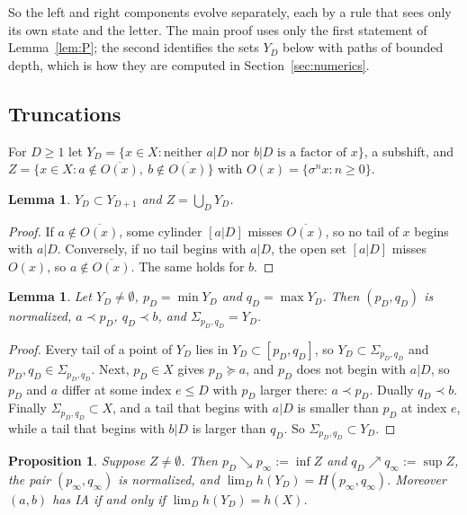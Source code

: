 \documentclass[11pt]{amsart}
\newtheorem{proposition}[theorem]{Proposition}
\newtheorem{lemma}[theorem]{Lemma}
\theoremstyle{definition}
\theoremstyle{remark}
\newcommand{\gex}{\succcurlyeq}
\begin{document}
So the left and right components evolve separately, each by a rule that sees only its own state and the letter. The main proof uses only the first statement of Lemma~\ref{lem:P}; the second identifies the sets $Y_D$ below with paths of bounded depth, which is how they are computed in Section~\ref{sec:numerics}.

\subsection{Truncations}
For $D\ge1$ let $Y_D=\{x\in X:\text{neither }a|D\text{ nor }b|D\text{ is a factor of }x\}$, a subshift, and $Z=\{x\in X:a\notin\overline{O(x)},\ b\notin\overline{O(x)}\}$ with $O(x)=\{\sigma^nx:n\ge0\}$.

\begin{lemma}\label{lem:Y1}
$Y_D\subset Y_{D+1}$ and $Z=\bigcup_DY_D$.
\end{lemma}

\begin{proof}
If $a\notin\overline{O(x)}$, some cylinder $[a|D]$ misses $\overline{O(x)}$, so no tail of $x$ begins with $a|D$. Conversely, if no tail begins with $a|D$, the open set $[a|D]$ misses $O(x)$, so $a\notin\overline{O(x)}$. The same holds for $b$.
\end{proof}

\begin{lemma}\label{lem:Y2}
Let $Y_D\ne\emptyset$, $p_D=\min Y_D$ and $q_D=\max Y_D$. Then $(p_D,q_D)$ is normalized, $a\prec p_D$, $q_D\prec b$, and $\Sigma_{p_D,q_D}=Y_D$.
\end{lemma}

\begin{proof}
Every tail of a point of $Y_D$ lies in $Y_D\subset[p_D,q_D]$, so $Y_D\subset\Sigma_{p_D,q_D}$ and $p_D,q_D\in\Sigma_{p_D,q_D}$. Next, $p_D\in X$ gives $p_D\gex a$, and $p_D$ does not begin with $a|D$, so $p_D$ and $a$ differ at some index $e\le D$ with $p_D$ larger there: $a\prec p_D$. Dually $q_D\prec b$. Finally $\Sigma_{p_D,q_D}\subset X$, and a tail that begins with $a|D$ is smaller than $p_D$ at index $e$, while a tail that begins with $b|D$ is larger than $q_D$. So $\Sigma_{p_D,q_D}\subset Y_D$.
\end{proof}

\begin{proposition}\label{prop:Y3}
Suppose $Z\ne\emptyset$. Then $p_D\searrow p_\infty:=\inf Z$ and $q_D\nearrow q_\infty:=\sup Z$, the pair $(p_\infty,q_\infty)$ is normalized, and $\lim_Dh(Y_D)=H(p_\infty,q_\infty)$. Moreover $(a,b)$ has IA if and only if $\lim_Dh(Y_D)=h(X)$.
\end{proposition}
\end{document}
